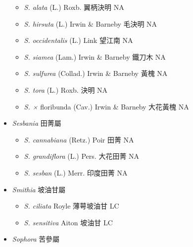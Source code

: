 \begin{itemize}
  \begin{itemize}
        \item[] \textit{S. alata} (L.) Roxb.  翼柄決明   NA
        \item[] \textit{S. hirsuta} (L.) Irwin \& Barneby  毛決明   NA
        \item[] \textit{S. occidentalis} (L.) Link  望江南   NA
        \item[] \textit{S. siamea} (Lam.) Irwin \& Barneby  鐵刀木   NA
        \item[] \textit{S. sulfurea} (Collad.) Irwin \& Barneby  黃槐   NA
        \item[] \textit{S. tora} (L.) Roxb.  決明   NA
        \item[] \textit{S. ×} floribunda \textit{} (Cav.) Irwin \& Barneby  大花黃槐   NA
  \end{itemize}
 \item[] \textit{Sesbania} 田菁屬
                                
  \begin{itemize}
        \item[] \textit{S. cannabiana} (Retz.) Poir  田菁   NA
        \item[] \textit{S. grandiflora} (L.) Pers.  大花田菁   NA
        \item[] \textit{S. sesban} (L.) Merr.  印度田菁   NA
  \end{itemize}
 \item[] \textit{Smithia} 坡油甘屬
                                
  \begin{itemize}
        \item[] \textit{S. ciliata} Royle  薄萼坡油甘   LC
        \item[] \textit{S. sensitiva} Aiton  坡油甘   LC
  \end{itemize}
 \item[] \textit{Sophora} 苦參屬
                                

\end{itemize}
